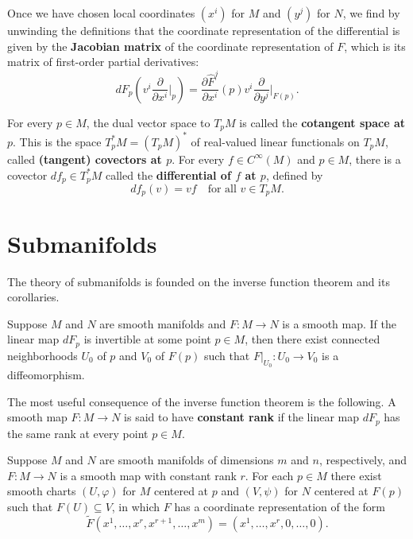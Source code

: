 Once we have chosen local coordinates $(x^i)$ for $M$ and $(y^j)$ for $N$, we find by unwinding the definitions that the coordinate representation of the differential is given by the \textbf{Jacobian matrix} of the coordinate representation of $F$, which is its matrix of first-order partial derivatives:
\begin{equation}
dF_p\left(v^i \frac{\partial}{\partial x^i}\bigg|_p\right) = \frac{\partial \hat{F}^j}{\partial x^i}(p) v^i \frac{\partial}{\partial y^j}\bigg|_{F(p)}.
\end{equation}

For every $p \in M$, the dual vector space to $T_p M$ is called the \textbf{cotangent space at $p$}. This is the space $T_p^* M = (T_p M)^*$ of real-valued linear functionals on $T_p M$, called \textbf{(tangent) covectors at $p$}. For every $f \in C^\infty(M)$ and $p \in M$, there is a covector $df_p \in T_p^* M$ called the \textbf{differential of $f$ at $p$}, defined by
\begin{equation}
df_p(v) = vf \quad \text{for all } v \in T_p M.
\tag{A.4}
\end{equation}

\section{Submanifolds}

The theory of submanifolds is founded on the inverse function theorem and its corollaries.

\begin{theorem}
\label{thm:inverse-function-theorem-manifolds}
Suppose $M$ and $N$ are smooth manifolds and $F: M \to N$ is a smooth map. If the linear map $dF_p$ is invertible at some point $p \in M$, then there exist connected neighborhoods $U_0$ of $p$ and $V_0$ of $F(p)$ such that $F|_{U_0}: U_0 \to V_0$ is a diffeomorphism.
\end{theorem}

The most useful consequence of the inverse function theorem is the following. A smooth map $F: M \to N$ is said to have \textbf{constant rank} if the linear map $dF_p$ has the same rank at every point $p \in M$.

\begin{theorem}
\label{thm:rank-theorem}
Suppose $M$ and $N$ are smooth manifolds of dimensions $m$ and $n$, respectively, and $F: M \to N$ is a smooth map with constant rank $r$. For each $p \in M$ there exist smooth charts $(U, \varphi)$ for $M$ centered at $p$ and $(V, \psi)$ for $N$ centered at $F(p)$ such that $F(U) \subseteq V$, in which $F$ has a coordinate representation of the form
\begin{equation}
\tilde{F}(x^1, \ldots, x^r, x^{r+1}, \ldots, x^m) = (x^1, \ldots, x^r, 0, \ldots, 0). \tag{A.5}
\end{equation}
\end{theorem}

